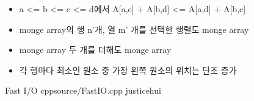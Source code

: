 \documentclass[landscape, 10pt, a4paper, oneside, twocolumn]{extarticle}
\begin{document}
\begin{itemize}
    \item a <= b <= c <= d에서 A[a,c] + A[b,d] <= A[a,d] + A[b,c]
    \item monge array의 행 n'개, 열 m' 개를 선택한 행렬도 monge array
    \item monge array 두 개를 더해도 monge array
    \item 각 행마다 최소인 원소 중 가장 왼쪽 원소의 위치는 단조 증가
\end{itemize}

\Algorithm
{Fast I/O}
{}
{}
{cpp}{source/FastIO.cpp}
{justicehui}
\end{document}
